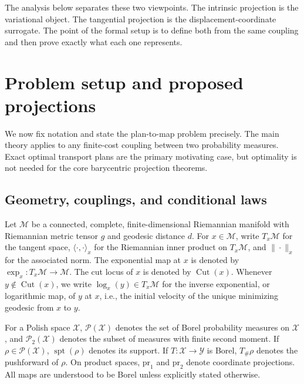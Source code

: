 \documentclass[10pt]{article} %
\theoremstyle{definition}
\providecommand{\1}{\mathbf{1}}
\providecommand{\sM}{\mathcal{M}}
\providecommand{\sX}{\mathcal{X}}
\providecommand{\sY}{\mathcal{Y}}
\DeclareMathOperator{\spt}{spt}
\DeclareMathOperator{\Cut}{Cut}
\begin{document}
The analysis below separates these two viewpoints. The intrinsic projection is the variational object. The tangential projection is the displacement-coordinate surrogate. The point of the formal setup is to define both from the same coupling and then prove exactly what each one represents.




\section{Problem setup and proposed projections}
\label{sec:setup}

We now fix notation and state the plan-to-map problem precisely. The main theory applies to any finite-cost coupling between two probability measures. Exact optimal transport plans are the primary motivating case, but optimality is not needed for the core barycentric projection theorems.



\subsection{Geometry, couplings, and conditional laws}

Let $\sM$ be a connected, complete, finite-dimensional Riemannian manifold with Riemannian metric tensor $g$ and geodesic distance $d$. For $x\in\sM$, write $T_x\sM$ for the tangent space, $\langle\cdot,\cdot\rangle_x$ for the Riemannian inner product on $T_x\sM$, and $\|\cdot\|_x$ for the associated norm. The exponential map at $x$ is denoted by $\exp_x:T_x\sM\to\sM$. The cut locus of $x$ is denoted by $\Cut(x)$. Whenever $y\notin\Cut(x)$, we write $\log_x(y)\in T_x\sM$ for the inverse exponential, or logarithmic map, of \(y\) at \(x\), i.e., the initial velocity of the unique minimizing geodesic from $x$ to $y$.


For a Polish space $\sX$, $\mathcal P(\sX)$ denotes the set of Borel probability measures on $\sX$, and $\mathcal P_2(\sX)$ denotes the subset of measures with finite second moment. If $\rho\in\mathcal P(\sX)$, $\spt(\rho)$ denotes its support. If $T:\sX\to\sY$ is Borel, $T_\#\rho$ denotes the pushforward of $\rho$. On product spaces, $\mathrm{pr}_1$ and $\mathrm{pr}_2$ denote coordinate projections. All maps are understood to be Borel unless explicitly stated otherwise.
\end{document}
